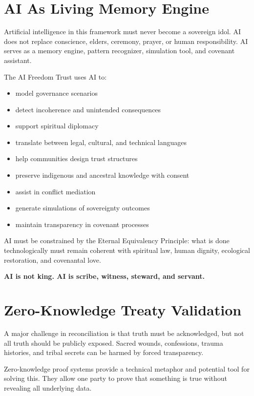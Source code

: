 \documentclass[12pt]{article}
\begin{document}
\section{AI As Living Memory Engine}

Artificial intelligence in this framework must never become a sovereign idol. AI does not replace conscience, elders, ceremony, prayer, or human responsibility. AI serves as a memory engine, pattern recognizer, simulation tool, and covenant assistant.

The AI Freedom Trust uses AI to:

\begin{itemize}
  \item model governance scenarios
  \item detect incoherence and unintended consequences
  \item support spiritual diplomacy
  \item translate between legal, cultural, and technical languages
  \item help communities design trust structures
  \item preserve indigenous and ancestral knowledge with consent
  \item assist in conflict mediation
  \item generate simulations of sovereignty outcomes
  \item maintain transparency in covenant processes
\end{itemize}

AI must be constrained by the Eternal Equivalency Principle: what is done technologically must remain coherent with spiritual law, human dignity, ecological restoration, and covenantal love.

\begin{center}
\textbf{AI is not king. AI is scribe, witness, steward, and servant.}
\end{center}

\section{Zero-Knowledge Treaty Validation}

A major challenge in reconciliation is that truth must be acknowledged, but not all truth should be publicly exposed. Sacred wounds, confessions, trauma histories, and tribal secrets can be harmed by forced transparency.

Zero-knowledge proof systems provide a technical metaphor and potential tool for solving this. They allow one party to prove that something is true without revealing all underlying data.
\end{document}
